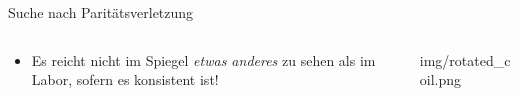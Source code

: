 \begin{frame}{Suche nach Parit\"atsverletzung}
\begin{columns}[T]
\begin{column}{.6\textwidth}
{\begin{itemize}
\begin{itemize}
                    \item Es reicht nicht im Spiegel \textit{etwas anderes} zu sehen als im Labor, sofern es konsistent ist!
                \end{itemize}
            \end{itemize}}
		\end{column}
		\begin{column}{.4\textwidth}
			\centering
			\begin{overpic}[width=\textwidth,trim=150 0 150 0,clip]{img/rotated_coil.png}
            \end{overpic}
		\end{column}
    \end{columns}
\end{frame}
